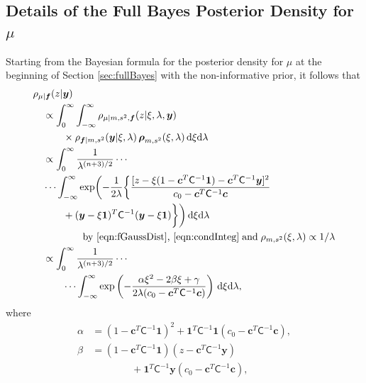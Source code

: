 \documentclass[twocolumn]{svjour3}          %
\newcommand{\bm}[1]{\boldsymbol{#1}}
\newcommand{\D}[1]{\text{d}{#1}}
\newcommand{\vc}{\bm{c}}
\newcommand{\vf}{\bm{f}}
\newcommand{\vrho}{\bm{\rho}}
\newcommand{\vy}{\bm{y}}
\newcommand{\vone}{\bm{1}}
\newcommand{\mC}{\mathsf{C}}
\begin{document}




\begin{appendices}
\section{Details of the Full Bayes Posterior Density for $\mu$} \label{appendix:full_bayes}
Starting from the Bayesian formula for the posterior density for $\mu$ at the beginning of Section \ref{sec:fullBayes} with the non-informative prior, it follows that 
\begin{align*}
\MoveEqLeft[1]{\rho_{\mu|\vf}(z | \vy)}\\
& \propto \int_{0}^\infty \int_{-\infty}^\infty 
\rho_{\mu | m, s^2, \vf}(z | \xi, \lambda , \vy) \\
& \qquad \times  \rho_{\vf | m, s^2} (\vy | \xi, \lambda) \, \vrho_{m,s^2}(\xi,\lambda)  \, \D \xi \D \lambda \\
& \propto \displaystyle \int_{0}^\infty  \frac{1}{\lambda^{(n+3)/2}} \cdots \\
& \cdots \int_{-\infty}^\infty  \exp \biggl( -\frac{1}{2\lambda}\biggl\{
\frac{
	[z - \xi (1 - \vc^T \mC^{-1} \vone)  -  \vc^T \mC^{-1} \vy]^2}
{c_0  -\vc ^T \mC^{-1} \vc}  \\
& \qquad + (\vy - \xi \vone)^T \mC^{-1}(\vy - \xi \vone) \biggr \} \biggr) \, \D \xi \D \lambda \\
& \qquad \qquad
\text{by \eqref{eqn:fGaussDist}, \eqref{eqn:condInteg}} \; \text{and} \; \rho_{m,s^2}(\xi,\lambda) \propto 1/\lambda \\
& \propto \displaystyle \int_{0}^\infty  \frac{1}{\lambda^{(n+3)/2}}  \cdots  \\ 
& \qquad  \cdots  \int_{-\infty}^\infty  \exp\left( -\frac{\alpha \xi^2 -2 \beta \xi + \gamma}{2\lambda(c_0  -\vc ^T \mC^{-1} \vc)} \right) \, \D \xi \D \lambda,
\end{align*}
where
\begin{align*}
\alpha & = (1 - \vc^T \mC^{-1} \vone)^2 + \vone^T \mC^{-1} \vone (c_0  -\vc ^T \mC^{-1} \vc),\\
\beta & =(1 - \vc^T \mC^{-1} \vone)(z - \vc^T \mC^{-1} \vy ) \\
& \qquad \qquad  + \vone^T \mC^{-1} \vy (c_0  -\vc ^T \mC^{-1} \vc),\\

\end{align*}
\end{appendices}
\end{document}
